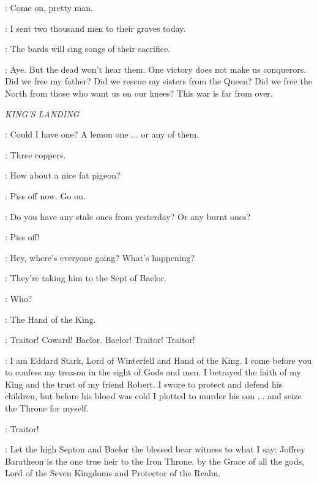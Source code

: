 \UMBER: Come on, pretty man. 


\ROBB: I sent two thousand men to their graves today. 

\THEON: The bards will sing songs of their sacrifice. 

\ROBB: Aye. But the dead won't hear them.  One victory does not make us conquerors. Did we free my father? Did we rescue my sisters from the Queen? Did we free the North from those who want us on our knees? This war is far from over. 


\scene

\textit{KING'S LANDING}


\ARYA: Could I have one? A lemon one $\ldots$ or any of them. 

\PIESELLER: Three coppers. 

\ARYA: How about a nice fat pigeon? 

\PIESELLER: Piss off now. Go on. 

\ARYA: Do you have any stale ones from yesterday? Or any burnt ones? 

\PIESELLER: Piss off! 

\ARYA: Hey, where's everyone going? What's happening? 

\URCHIN: They're taking him to the Sept of Baelor. 

\ARYA: Who? 

\URCHIN: The Hand of the King. 


\CROWD: Traitor! Coward! Baelor. Baelor! Traitor! Traitor! 

\NED: I am Eddard Stark, Lord of Winterfell and Hand of the King. I come before you to confess my treason in the sight of Gods and men. I betrayed the faith of my King and the trust of my friend Robert. I swore to protect and defend his children, but before his blood was cold I plotted to murder his son $\ldots$ and seize the Throne for myself. 

\CROWD: Traitor! 

\NED: Let the high Septon and Baelor the blessed bear witness to what I say: Joffrey Baratheon is the one true heir to the Iron Throne, by the Grace of all the gods, Lord of the Seven Kingdoms and Protector of the Realm. 

